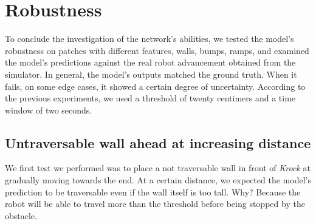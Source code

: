 \documentclass[../document.tex]{subfiles}
\begin{document}
\section{Robustness}
\label{sec: robustness}
To conclude the investigation of the network's abilities, we tested the model's robustness on patches with different features, walls, bumps, ramps, and examined the model's predictions against the real robot advancement obtained from the simulator. In general, the model's outputs matched the ground truth. When it fails, on some edge cases, it showed a certain degree of uncertainty. According to the previous experiments, we used a threshold of twenty centimers and a time window of two seconds. 
\subsection{Untraversable wall ahead at increasing distance}
We first test we performed was to place a not traversable wall in front of \emph{Krock} at gradually moving towards the end. At a certain distance, we expected the model's prediction to be traversable even if the wall itself is too tall. Why? Because the robot will be able to travel more than the threshold before being stopped by the obstacle.
\end{document}
